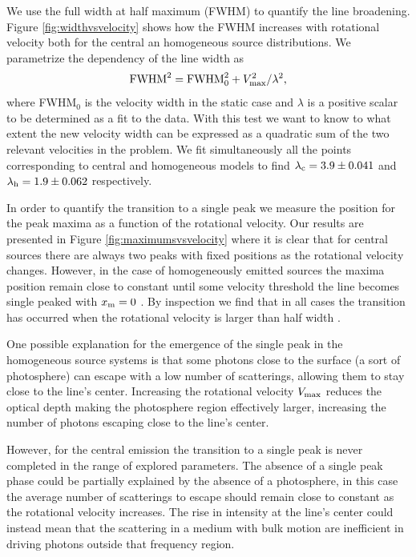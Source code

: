 \documentclass{emulateapj}
\newcommand{\kms}{{\ifmmode{{\mathrm{\,km\ s}^{-1}}}\else{\,km~s$^{-1}$}\fi}}
\begin{document}
We use the full width at half maximum (FWHM) to quantify the line
broadening. Figure \ref{fig:widthvsvelocity} shows how the FWHM increases
with rotational velocity both for the central an homogeneous source
distributions.  We parametrize the dependency of the line width as
\begin{equation}
 {\rm FWHM}^2 = {\rm FWHM}_{0}^2 + V_{\rm max}^2/\lambda^2,
\label{eq:fwhm}
\end{equation}
%
where FWHM$_{0}$ is the
velocity width in the static case and $\lambda$ is a positive scalar
to be determined as a fit to the data. With this test we want to know
to what extent the new velocity width can be expressed as a quadratic
sum of the two relevant velocities in the problem. We fit
simultaneously all the points corresponding to central and homogeneous
models to find $\lambda_{\rm c} = 3.9 \pm 0.041$ and $\lambda_{\rm h}=
1.9\pm 0.062$ respectively. 

In order to quantify the transition to a single peak we measure the
position for the peak maxima as a function of the rotational
velocity. Our results are presented in Figure
\ref{fig:maximumsvsvelocity} where it is clear that for central
sources there are always two peaks with fixed positions as the rotational
velocity changes. However, in the case of homogeneously emitted
sources the maxima position remain close to constant until some
velocity threshold the line becomes single peaked with $x_{\rm m}=0$
\kms. By inspection we find that in all cases the transition has
occurred when the rotational velocity is larger than half width .

One possible explanation for the emergence of the single peak in the
homogeneous source systems is that some photons close to the surface
(a sort of photosphere) can escape with a low number of scatterings,
allowing them to stay close to the line's center. Increasing the
rotational velocity $V_{\rm max}$ reduces the optical depth making the
photosphere region effectively larger, increasing the number of
photons escaping close to the line's center. 

However, for the central emission the transition to a single peak is
never completed in the range of explored parameters. The absence
of a single peak phase could be partially explained by the absence of a
photosphere, in this case the average number of scatterings to escape
should remain close to constant as the rotational velocity
increases. The rise in intensity at the line's center could instead
mean that the scattering in a medium with bulk motion are inefficient
in driving photons outside that frequency region.
\end{document}
